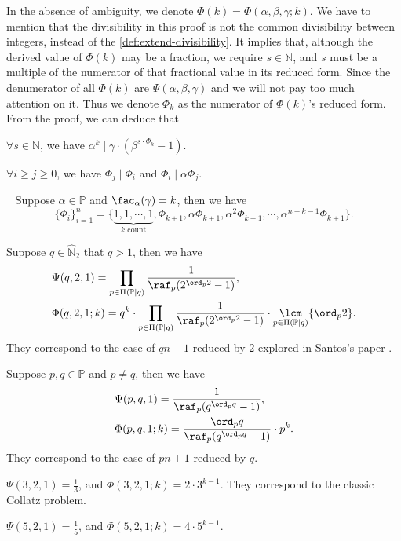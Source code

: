 In the absence of ambiguity, we denote $\Phi(k) = \Phi(\alpha, \beta, \gamma; k)$.
We have to mention that the divisibility in this proof is not the common divisibility between integers, instead of the \cref{def:extend-divisibility}. It implies that, although the derived value of $\Phi(k)$ may be a fraction, we require $s \in \mathbb{N}$, and $s$ must be a multiple of the numerator of that fractional value in its reduced form. Since the denumerator of all $\Phi(k)$ are $\Psi(\alpha,\beta,\gamma)$ and we will not pay too much attention on it.
Thus we denote $\Phi_k$ as the numerator of $\Phi(k)$'s reduced form.
From the proof, we can deduce that
\begin{corollary}
    $\forall s \in\mathbb{N}$, we have $\alpha^{k} \mid \gamma\cdot(\beta^{s\cdot\Phi_k} - 1)$.
\end{corollary}
\begin{corollary}
    $\forall i \ge j \ge 0$, we have $\Phi_j \mid \Phi_i$ and $\Phi_i \mid \alpha \Phi_j$.
\end{corollary}
\begin{corollary}~\label{cor:sequence-of-Phi}
    Suppose $\alpha\in\mathbb{P}$ and $\fac_{\alpha}(\gamma) = k$, then we have
    \[ \{\Phi_i\}_{i=1}^{n} = \{\underbrace{1, 1, \cdots, 1}_{k \text{ count}}, \Phi_{k+1}, \alpha\Phi_{k+1}, \alpha^{2}\Phi_{k+1}, \cdots, \alpha^{n-k-1}\Phi_{k+1}\}. \]
\end{corollary}
\begin{example}
    Suppose $q \in\widehat{\mathbb{N}}_{2}$ that $q > 1$, then we have \begin{align*}
        &\Psi(q, 2, 1) = \prod_{p\in\Pi(\mathbb{P}\mid q)}\frac{1}{\raf_{p}(2^{\ord_{p}2} - 1)}, \\
        &\Phi(q, 2, 1; k) = q^{k}\cdot\prod_{p\in\Pi(\mathbb{P}\mid q)}\frac{1}{\raf_{p}(2^{\ord_{p}2} - 1)} \cdot \underset{p\in\Pi(\mathbb{P}\mid q)}{\lcm}\{\ord_{p}2\}.
    \end{align*}
    They correspond to the case of $qn+1$ reduced by $2$ explored in Santos's paper \cite{santos2021collatzgeneralproblemqn1}.
\end{example}
\begin{example}
    Suppose $p, q \in \mathbb{P}$ and $p\ne q$, then we have \begin{align*}
        &\Psi(p, q, 1) = \frac{1}{\raf_{p}(q^{\ord_{p}q} - 1)}, \\
        &\Phi(p, q, 1; k) = \frac{\ord_{p}q}{\raf_{p}(q^{\ord_{p}q} - 1)} \cdot p^{k}.
    \end{align*}
    They correspond to the case of $pn+1$ reduced by $q$.
\end{example}
\begin{example}
    $\Psi(3,2,1) = \frac{1}{3}$, and $\Phi(3, 2, 1; k) = 2 \cdot 3^{k - 1}$. They correspond to the classic Collatz problem.
\end{example}
\begin{example}
    $\Psi(5,2,1) = \frac{1}{5}$, and $\Phi(5, 2, 1; k) = 4 \cdot 5^{k - 1}$.
\end{example}

